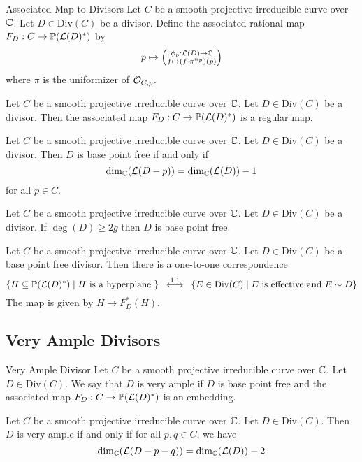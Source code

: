 \documentclass[a4paper]{article}
\begin{document}
\begin{defn}{Associated Map to Divisors}{} Let $C$ be a smooth projective irreducible curve over $\mathbb{C}$. Let $D\in\text{Div}(C)$ be a divisor. Define the associated rational map $F_D:C\to\mathbb{P}(\mathcal{L}(D)^\ast)$ by $$p\mapsto\left(\substack{\phi_p:\mathcal{L}(D)\to\mathbb{C}\\f\mapsto(f\cdot\pi^{n_p})(p)}\right)$$ where $\pi$ is the uniformizer of $\mathcal{O}_{C,p}$. 
\end{defn}

\begin{lmm}{}{} Let $C$ be a smooth projective irreducible curve over $\mathbb{C}$. Let $D\in\text{Div}(C)$ be a divisor. Then the associated map $F_D:C\to\mathbb{P}(\mathcal{L}(D)^\ast)$ is a regular map. 
\end{lmm}

\begin{prp}{}{} Let $C$ be a smooth projective irreducible curve over $\mathbb{C}$. Let $D\in\text{Div}(C)$ be a divisor. Then $D$ is base point free if and only if $$\dim_{\mathbb{C}}(\mathcal{L}(D-p))=\dim_{\mathbb{C}}(\mathcal{L}(D))-1$$ for all $p\in C$. 
\end{prp}

\begin{crl}{}{} Let $C$ be a smooth projective irreducible curve over $\mathbb{C}$. Let $D\in\text{Div}(C)$ be a divisor. If $\deg(D)\geq 2g$ then $D$ is base point free. 
\end{crl}

\begin{prp}{}{} Let $C$ be a smooth projective irreducible curve over $\mathbb{C}$. Let $D\in\text{Div}(C)$ be a base point free divisor. Then there is a one-to-one correspondence $$\{H\subseteq\mathbb{P}(\mathcal{L}(D)^\ast)\;|\;H\text{ is a hyperplane }\}\;\;\overset{1:1}{\longleftrightarrow}\;\;\{E\in\text{Div}(C)\;|\;E\text{ is effective and }E\sim D\}$$ The map is given by $H\mapsto F_D^\ast(H)$. 
\end{prp}

\subsection{Very Ample Divisors}
\begin{defn}{Very Ample Divisor}{} Let $C$ be a smooth projective irreducible curve over $\mathbb{C}$. Let $D\in\text{Div}(C)$. We say that $D$ is very ample if $D$ is base point free and the associated map $F_D:C\to\mathbb{P}(\mathcal{L}(D)^\ast)$ is an embedding. 
\end{defn}

\begin{prp}{}{} Let $C$ be a smooth projective irreducible curve over $\mathbb{C}$. Let $D\in\text{Div}(C)$. Then $D$ is very ample if and only if for all $p,q\in C$, we have $$\dim_{\mathbb{C}}(\mathcal{L}(D-p-q))=\dim_{\mathbb{C}}(\mathcal{L}(D))-2$$
\end{prp}
\end{document}
